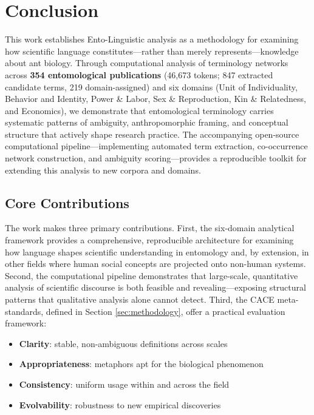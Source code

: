 \documentclass[
]{article}
\providecommand{\tightlist}{%
  \setlength{\itemsep}{0pt}\setlength{\parskip}{0pt}}
\numberwithin{equation}{section}
\begin{document}
\newpage

\section{Conclusion}\label{sec:conclusion}

This work establishes Ento-Linguistic analysis as a methodology for
examining how scientific language constitutes---rather than merely
represents---knowledge about ant biology. Through computational analysis
of terminology networks across \textbf{354 entomological publications}
(46,673 tokens; 847 extracted candidate terms, 219 domain-assigned) and
six domains (Unit of Individuality, Behavior and Identity, Power \&
Labor, Sex \& Reproduction, Kin \& Relatedness, and Economics), we
demonstrate that entomological terminology carries systematic patterns
of ambiguity, anthropomorphic framing, and conceptual structure that
actively shape research practice. The accompanying open-source
computational pipeline---implementing automated term extraction,
co-occurrence network construction, and ambiguity scoring---provides a
reproducible toolkit for extending this analysis to new corpora and
domains.

\subsection{Core Contributions}\label{core-contributions}

The work makes three primary contributions. First, the six-domain
analytical framework provides a comprehensive, reproducible architecture
for examining how language shapes scientific understanding in entomology
and, by extension, in other fields where human social concepts are
projected onto non-human systems. Second, the computational pipeline
demonstrates that large-scale, quantitative analysis of scientific
discourse is both feasible and revealing---exposing structural patterns
that qualitative analysis alone cannot detect. Third, the CACE
meta-standards, defined in Section \ref{sec:methodology}, offer a
practical evaluation framework:

\begin{itemize}
\tightlist
\item
  \textbf{Clarity}: stable, non-ambiguous definitions across scales
\item
  \textbf{Appropriateness}: metaphors apt for the biological phenomenon
\item
  \textbf{Consistency}: uniform usage within and across the field
\item
  \textbf{Evolvability}: robustness to new empirical discoveries
\end{itemize}
\end{document}
